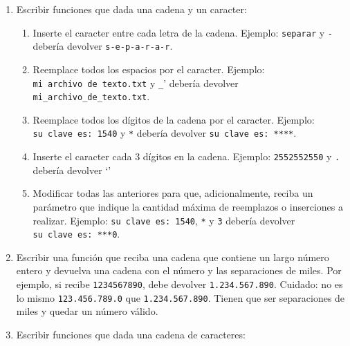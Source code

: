 \documentclass[
  letterpaper,
  DIV=11,
  numbers=noendperiod]{scrreprt}
\begin{document}
\begin{enumerate}
\def\labelenumi{\arabic{enumi}.}
\item
  Escribir funciones que dada una cadena y un caracter:

  \begin{enumerate}
  \def\labelenumii{\alph{enumii}.}
  \item
    Inserte el caracter entre cada letra de la cadena. Ejemplo:
    \texttt{\textquotesingle{}separar\textquotesingle{}} y
    \texttt{\textquotesingle{}-\textquotesingle{}} debería devolver
    \texttt{\textquotesingle{}s-e-p-a-r-a-r\textquotesingle{}}.\\
  \item
    Reemplace todos los espacios por el caracter. Ejemplo:
    \texttt{\textquotesingle{}mi\ archivo\ de\ texto.txt\textquotesingle{}}
    y \texttt{\textquotesingle{}\_}' debería devolver
    \texttt{\textquotesingle{}mi\_archivo\_de\_texto.txt\textquotesingle{}}.\\
  \item
    Reemplace todos los dígitos de la cadena por el caracter. Ejemplo:
    \texttt{\textquotesingle{}su\ clave\ es:\ 1540\textquotesingle{}} y
    \texttt{\textquotesingle{}*\textquotesingle{}} debería devolver
    \texttt{\textquotesingle{}su\ clave\ es:\ ****\textquotesingle{}}.\\
  \item
    Inserte el caracter cada 3 dígitos en la cadena. Ejemplo:
    \texttt{\textquotesingle{}2552552550\textquotesingle{}} y
    \texttt{\textquotesingle{}.\textquotesingle{}} debería devolver `'
  \item
    Modificar todas las anteriores para que, adicionalmente, reciba un
    parámetro que indique la cantidad máxima de reemplazos o inserciones
    a realizar. Ejemplo:
    \texttt{\textquotesingle{}su\ clave\ es:\ 1540\textquotesingle{}},
    \texttt{\textquotesingle{}*\textquotesingle{}} y \texttt{3} debería
    devolver
    \texttt{\textquotesingle{}su\ clave\ es:\ ***0\textquotesingle{}}.
  \end{enumerate}
\item
  Escribir una función que reciba una cadena que contiene un largo
  número entero y devuelva una cadena con el número y las separaciones
  de miles. Por ejemplo, si recibe \texttt{1234567890}, debe devolver
  \texttt{1.234.567.890}. Cuidado: no es lo mismo \texttt{123.456.789.0}
  que \texttt{1.234.567.890}. Tienen que ser separaciones de miles y
  quedar un número válido.
\item
  Escribir funciones que dada una cadena de caracteres:


\end{enumerate}
\end{document}

